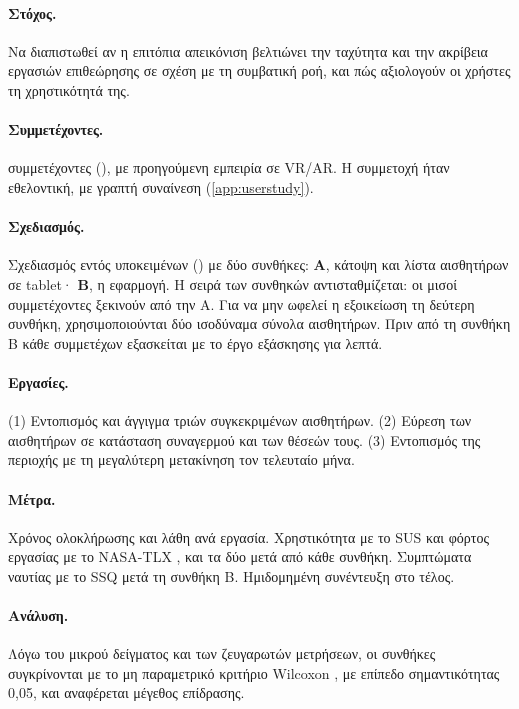 \paragraph{Στόχος.} Να διαπιστωθεί αν η επιτόπια απεικόνιση βελτιώνει την ταχύτητα και την ακρίβεια εργασιών επιθεώρησης σε σχέση με τη συμβατική ροή, και πώς αξιολογούν οι χρήστες τη χρηστικότητά της.

\paragraph{Συμμετέχοντες.}  συμμετέχοντες (),  με προηγούμενη εμπειρία σε VR/AR. Η συμμετοχή ήταν εθελοντική, με γραπτή συναίνεση (\cref{app:userstudy}).

\paragraph{Σχεδιασμός.} Σχεδιασμός εντός υποκειμένων () με δύο συνθήκες: \textbf{Α}, κάτοψη και λίστα αισθητήρων σε tablet· \textbf{Β}, η εφαρμογή. Η σειρά των συνθηκών αντισταθμίζεται: οι μισοί συμμετέχοντες ξεκινούν από την Α. Για να μην ωφελεί η εξοικείωση τη δεύτερη συνθήκη, χρησιμοποιούνται δύο ισοδύναμα σύνολα αισθητήρων. Πριν από τη συνθήκη Β κάθε συμμετέχων εξασκείται με το έργο εξάσκησης για  λεπτά.

\paragraph{Εργασίες.} (1) Εντοπισμός και άγγιγμα τριών συγκεκριμένων αισθητήρων. (2) Εύρεση των αισθητήρων σε κατάσταση συναγερμού και των θέσεών τους. (3) Εντοπισμός της περιοχής με τη μεγαλύτερη μετακίνηση τον τελευταίο μήνα.

\paragraph{Μέτρα.} Χρόνος ολοκλήρωσης και λάθη ανά εργασία. Χρηστικότητα με το SUS \cite{brooke1996sus} και φόρτος εργασίας με το NASA-TLX \cite{hart1988nasatlx}, και τα δύο μετά από κάθε συνθήκη. Συμπτώματα ναυτίας με το SSQ \cite{kennedy1993ssq} μετά τη συνθήκη Β. Ημιδομημένη συνέντευξη στο τέλος.

\paragraph{Ανάλυση.} Λόγω του μικρού δείγματος και των ζευγαρωτών μετρήσεων, οι συνθήκες συγκρίνονται με το μη παραμετρικό κριτήριο Wilcoxon \cite{wilcoxon1945}, με επίπεδο σημαντικότητας 0{,}05, και αναφέρεται μέγεθος επίδρασης.

